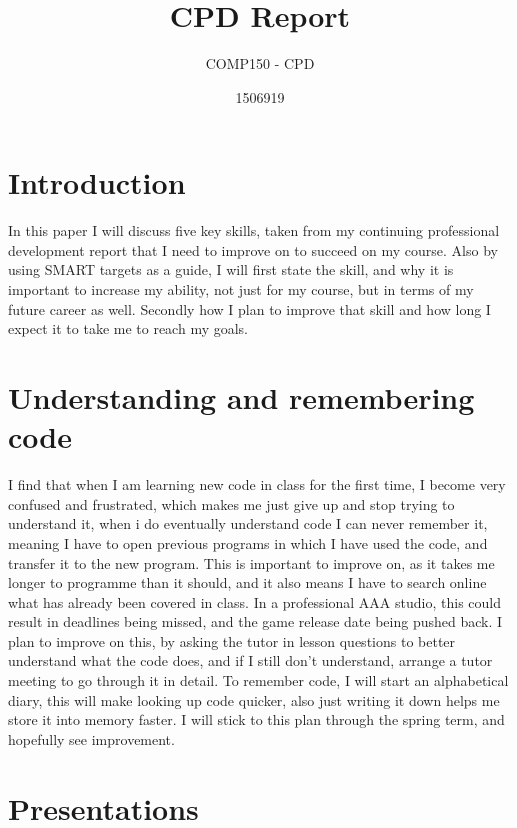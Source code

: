 \documentclass{scrartcl}
\title{CPD Report}
\subtitle{COMP150 - CPD}
\author{1506919}
\begin{document}
\maketitle

\section{Introduction}

In this paper I will discuss five key skills, taken from my continuing professional development report that I need to improve on to succeed on my course. Also by using SMART targets as a guide, I will first state the skill, and why it is important to increase my ability, not just for my course, but in terms of my future career as well. Secondly how I plan to improve that skill and how long I expect it to take me to reach my goals.

\section {Understanding and remembering code}

I find that when I am learning new code in class for the first time, I become very confused and frustrated, which makes me just give up and stop trying to understand it, when i do eventually understand code I can never remember it, meaning I have to open previous programs in which I have used the code, and transfer it to the new program. This is important to improve on, as it takes me longer to programme than it should, and it also means I have to search online what has already been covered in class. In a professional AAA studio, this could result in deadlines being missed, and the game release date being pushed back. I plan to improve on this, by asking the tutor in lesson questions to better understand what the code does, and if I still don't understand, arrange a tutor meeting to go through it in detail. To remember code, I will start an alphabetical diary, this will make looking up code quicker, also just writing it down helps me store it into memory faster. I will stick to this plan through the spring term, and hopefully see improvement.

\section {Presentations}
\end{document}
